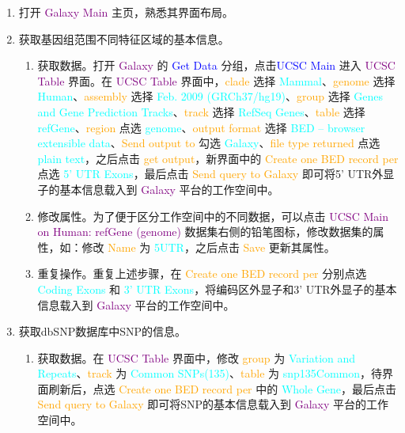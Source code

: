 \begin{description}
\begin{enumerate}
			\item 打开 \textcolor{purple}{Galaxy Main} 主页，熟悉其界面布局。
			\item 获取基因组范围不同特征区域的基本信息。
				\begin{enumerate}
					\item 获取数据。打开 \textcolor{purple}{Galaxy} 的 \textcolor{blue}{Get Data} 分组，点击\textcolor{blue}{UCSC Main} 进入 \textcolor{purple}{UCSC Table} 界面。在 \textcolor{purple}{UCSC Table} 界面中，\textcolor{orange}{clade} 选择 \textcolor{cyan}{Mammal}、\textcolor{orange}{genome} 选择 \textcolor{cyan}{Human}、\textcolor{orange}{assembly} 选择 \textcolor{cyan}{Feb. 2009 (GRCh37/hg19)}、\textcolor{orange}{group} 选择 \textcolor{cyan}{Genes and Gene Prediction Tracks}、\textcolor{orange}{track} 选择 \textcolor{cyan}{RefSeq Genes}、\textcolor{orange}{table} 选择 \textcolor{cyan}{refGene}、\textcolor{orange}{region} 点选 \textcolor{cyan}{genome}、\textcolor{orange}{output format} 选择 \textcolor{cyan}{BED – browser extensible data}、\textcolor{orange}{Send output to} 勾选 \textcolor{cyan}{Galaxy}、\textcolor{orange}{file type returned} 点选 \textcolor{cyan}{plain text}，之后点击 \textcolor{orange}{get output}，新界面中的 \textcolor{orange}{Create one BED record per} 点选 \textcolor{cyan}{5' UTR Exons}，最后点击 \textcolor{orange}{Send query to Galaxy} 即可将5' UTR外显子的基本信息载入到 \textcolor{purple}{Galaxy} 平台的工作空间中。
					\item 修改属性。为了便于区分工作空间中的不同数据，可以点击 \textcolor{purple}{UCSC Main on Human: refGene (genome)} 数据集右侧的铅笔图标，修改数据集的属性，如：修改 \textcolor{orange}{Name} 为 \textcolor{cyan}{5UTR}，之后点击 \textcolor{orange}{Save} 更新其属性。
					\item 重复操作。重复上述步骤，在 \textcolor{orange}{Create one BED record per} 分别点选 \textcolor{cyan}{Coding Exons} 和 \textcolor{cyan}{3' UTR Exons}，将编码区外显子和3' UTR外显子的基本信息载入到 \textcolor{purple}{Galaxy} 平台的工作空间中。
				\end{enumerate}
			\item 获取dbSNP数据库中SNP的信息。
				\begin{enumerate}
					\item 获取数据。在 \textcolor{purple}{UCSC Table} 界面中，修改 \textcolor{orange}{group} 为 \textcolor{cyan}{Variation and Repeats}、\textcolor{orange}{track} 为 \textcolor{cyan}{Common SNPs(135)}、\textcolor{orange}{table} 为 \textcolor{cyan}{snp135Common}，待界面刷新后，点选 \textcolor{orange}{Create one BED record per} 中的 \textcolor{cyan}{Whole Gene}，最后点击 \textcolor{orange}{Send query to Galaxy} 即可将SNP的基本信息载入到 \textcolor{purple}{Galaxy} 平台的工作空间中。

\end{enumerate}
\end{enumerate}
\end{description}
